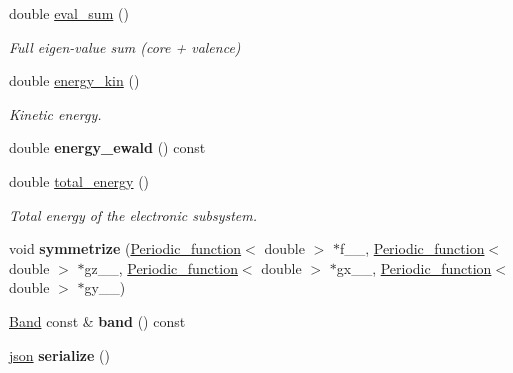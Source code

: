 \begin{DoxyCompactItemize}
\item 
double \hyperlink{classsirius_1_1_d_f_t__ground__state_af9e351c9f78fbd60077d038633dc1f99}{eval\+\_\+sum} ()
\begin{DoxyCompactList}\small\item\em Full eigen-\/value sum (core + valence) \end{DoxyCompactList}\item 
double \hyperlink{classsirius_1_1_d_f_t__ground__state_ac3379420b4fd37ca015046cecc3c0cb4}{energy\+\_\+kin} ()
\begin{DoxyCompactList}\small\item\em Kinetic energy. \end{DoxyCompactList}\item 
\hypertarget{classsirius_1_1_d_f_t__ground__state_a5690233f752eebc77e4a3510db70ba7c}{}double {\bfseries energy\+\_\+ewald} () const \label{classsirius_1_1_d_f_t__ground__state_a5690233f752eebc77e4a3510db70ba7c}

\item 
double \hyperlink{classsirius_1_1_d_f_t__ground__state_a1fd5ab1031c3a59b9be06eb2b81a0ccb}{total\+\_\+energy} ()
\begin{DoxyCompactList}\small\item\em Total energy of the electronic subsystem. \end{DoxyCompactList}\item 
\hypertarget{classsirius_1_1_d_f_t__ground__state_a4ef796dbb76fbbe75ac5ca3b46474298}{}void {\bfseries symmetrize} (\hyperlink{classsirius_1_1_periodic__function}{Periodic\+\_\+function}$<$ double $>$ $\ast$f\+\_\+\+\_\+, \hyperlink{classsirius_1_1_periodic__function}{Periodic\+\_\+function}$<$ double $>$ $\ast$gz\+\_\+\+\_\+, \hyperlink{classsirius_1_1_periodic__function}{Periodic\+\_\+function}$<$ double $>$ $\ast$gx\+\_\+\+\_\+, \hyperlink{classsirius_1_1_periodic__function}{Periodic\+\_\+function}$<$ double $>$ $\ast$gy\+\_\+\+\_\+)\label{classsirius_1_1_d_f_t__ground__state_a4ef796dbb76fbbe75ac5ca3b46474298}

\item 
\hypertarget{classsirius_1_1_d_f_t__ground__state_af0857298eaecee57d0c0e48b5df8fcfa}{}\hyperlink{classsirius_1_1_band}{Band} const \& {\bfseries band} () const \label{classsirius_1_1_d_f_t__ground__state_af0857298eaecee57d0c0e48b5df8fcfa}

\item 
\hypertarget{classsirius_1_1_d_f_t__ground__state_a8641b311d59d04b60c43350a60843ca5}{}\hyperlink{classnlohmann_1_1basic__json}{json} {\bfseries serialize} ()\label{classsirius_1_1_d_f_t__ground__state_a8641b311d59d04b60c43350a60843ca5}

\end{DoxyCompactItemize}

